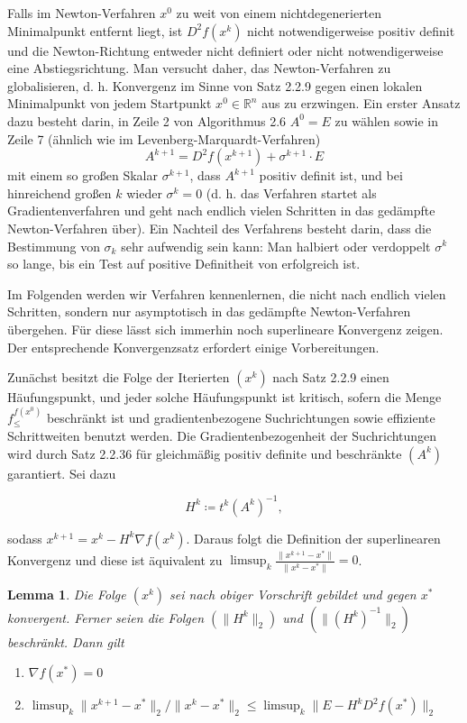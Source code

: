 \documentclass[11pt]{scrreprt}
\newcounter{thm}
\theoremstyle{thmstyle}
\numberwithin{thm}{section}
\newtheorem{lemma}[thm]{Lemma}
\begin{document}
Falls im Newton-Verfahren $x^0$ zu weit von einem nichtdegenerierten Minimalpunkt entfernt liegt, ist $D^2 f (x^k)$ nicht notwendigerweise positiv definit und die Newton-Richtung  entweder nicht definiert oder nicht notwendigerweise eine Abstiegsrichtung. Man versucht daher, das Newton-Verfahren zu globalisieren, d. h. Konvergenz im Sinne von Satz 2.2.9 gegen einen lokalen Minimalpunkt von jedem Startpunkt $x^0 \in \mathbb{R}^n$ aus zu erzwingen. Ein erster Ansatz dazu besteht darin, in Zeile 2 von Algorithmus 2.6 $A^0 = E$ zu wählen sowie in Zeile 7 (ähnlich wie im Levenberg-Marquardt-Verfahren)
		$$ A^{k+1} = D^2 f(x^{k+1}) + \sigma^{k+1} \cdot E $$
	mit einem so großen Skalar $\sigma^{k+1}$, dass $A^{k+1}$ positiv definit ist, und bei hinreichend großen $k$ wieder $\sigma^{k} = 0$ (d. h. das Verfahren startet als Gradientenverfahren und geht nach endlich vielen Schritten in das gedämpfte Newton-Verfahren über). Ein Nachteil des Verfahrens besteht darin, dass die Bestimmung von   $\sigma_k$ sehr aufwendig sein kann: Man halbiert oder verdoppelt $\sigma^{k}$ so lange, bis ein Test auf positive Definitheit von  erfolgreich ist.  ~\bigskip
	
	Im Folgenden werden wir Verfahren kennenlernen, die nicht nach endlich vielen Schritten, sondern nur asymptotisch in das gedämpfte Newton-Verfahren übergehen. Für diese lässt sich immerhin noch superlineare Konvergenz zeigen. Der entsprechende Konvergenzsatz erfordert einige Vorbereitungen.  ~\bigskip
	
	Zunächst besitzt die Folge der Iterierten $(x^k)$ nach Satz 2.2.9 einen Häufungspunkt, und jeder solche Häufungspunkt ist kritisch, sofern die Menge $f_{\leq}^{f(x^0)}$ beschränkt ist und gradientenbezogene Suchrichtungen sowie effiziente Schrittweiten benutzt werden. Die Gradientenbezogenheit der Suchrichtungen wird durch Satz 2.2.36 für gleichmäßig positiv definite und beschränkte $(A^k)$ garantiert. Sei dazu
	
	$$ H^k \coloneqq t^k \left( A^k \right)^{-1}, $$
	
	sodass $x^{k+1} = x^k - H^k \nabla f(x^k)$. Daraus folgt die Definition der superlinearen Konvergenz und diese ist äquivalent zu $\limsup_k \frac{\| x^{k+1} - x^* \|}{\| x^k - x^* \|} = 0$.
	
\setcounter{thm}{45}	
	
\begin{lemma}
	Die Folge $(x^k)$ sei nach obiger Vorschrift gebildet und gegen $x^*$ konvergent. Ferner seien die Folgen $(\| H^k \|_2)$ und $(\| (H^k)^{-1} \|_2)$ beschränkt. Dann gilt
	\begin{enumerate}[label=\alph*\upshape)]
		\item $\nabla f(x^*) = 0$
		\item $\limsup_k \| x^{k+1} - x^* \|_2 / \| x^k - x^*\|_2 \leq \limsup_k \| E - H^k D^2 f(x^*) \|_2$
	\end{enumerate}
\end{lemma}	
\end{document}
